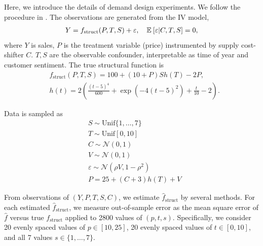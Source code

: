 Here, we introduce the details of demand design experiments. We follow the procedure in \citet{Singh2019}.
The observations are generated from the IV model,
\begin{align*}
    Y = f_\mathrm{struct}(P, T, S)+ \varepsilon, \quad \mathbb{E}_{}\left[\varepsilon |C, T, S\right] = 0,
\end{align*}
where $Y$ is sales, $P$ is the treatment variable (price) instrumented by supply cost-shifter $C$. $T,S$ are the observable confounder, interpretable as time of year and customer sentiment. The true structural function is 
\begin{align*}
    &f_\mathrm{struct}(P,T,S) = 100 + (10+P) S h(T) - 2P,\\
    &h(t) = 2\left(\frac{(t-5)^4}{600} + \exp(-4(t-5)^2) + \frac{t}{10} -2 \right).
\end{align*}

Data is sampled as 
\begin{align*}
    &S \sim \mathrm{Unif}\{1,\dots,7\}\\
    &T \sim \mathrm{Unif}[0,10]\\ 
    &C \sim \mathcal{N}(0,1)\\
    &V \sim \mathcal{N}(0,1)\\
    &\varepsilon \sim \mathcal{N}(\rho V, 1-\rho^2)\\
    &P =    25+(C+3)h(T) + V
\end{align*}

From observations of $(Y, P, T, S, C)$, we estimate $\hat{f}_\mathrm{struct}$ by several methods. For each estimated $\hat{f}_\mathrm{struct}$, we
measure out-of-sample error as the mean square error of $\hat{f}$ versus true $f_\mathrm{struct}$ applied to 2800 values of
$(p, t, s)$. Specifically, we consider 20 evenly spaced values of $p \in [10, 25]$, 20 evenly spaced values
of $t \in [0, 10]$, and all 7 values $s \in \{1, \dots, 7\}$.


